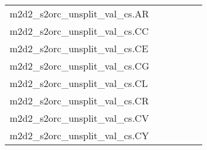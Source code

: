 {\begin{longtable}{m{6cm}m{1.7cm}m{1.7cm}m{1.7cm}m{1.7cm}m{1.7cm}}
	m2d2\_s2orc\_unsplit\_val\_cs.AR  & \colorbox[HTML]{a4d98a}{\makebox[\mywidth][c]{13.09}} & \colorbox[HTML]{e3f4aa}{\makebox[\mywidth][c]{13.36}} & \colorbox[HTML]{ffffe5}{\makebox[\mywidth][c]{15.30}} & \colorbox[HTML]{bfe596}{\makebox[\mywidth][c]{13.18}} & \colorbox[HTML]{77c578}{\makebox[\mywidth][c]{12.99}}\\
	m2d2\_s2orc\_unsplit\_val\_cs.CC  & \colorbox[HTML]{77c578}{\makebox[\mywidth][c]{8.45}} & \colorbox[HTML]{e8f6ae}{\makebox[\mywidth][c]{8.81}} & \colorbox[HTML]{ffffe5}{\makebox[\mywidth][c]{10.46}} & \colorbox[HTML]{d5eea1}{\makebox[\mywidth][c]{8.70}} & \colorbox[HTML]{a0d789}{\makebox[\mywidth][c]{8.54}}\\
	m2d2\_s2orc\_unsplit\_val\_cs.CE  & \colorbox[HTML]{c6e89a}{\makebox[\mywidth][c]{13.21}} & \colorbox[HTML]{def2a6}{\makebox[\mywidth][c]{13.31}} & \colorbox[HTML]{ffffe5}{\makebox[\mywidth][c]{15.01}} & \colorbox[HTML]{bee496}{\makebox[\mywidth][c]{13.18}} & \colorbox[HTML]{77c578}{\makebox[\mywidth][c]{13.02}}\\
	m2d2\_s2orc\_unsplit\_val\_cs.CG  & \colorbox[HTML]{77c578}{\makebox[\mywidth][c]{8.39}} & \colorbox[HTML]{e5f4ab}{\makebox[\mywidth][c]{8.68}} & \colorbox[HTML]{ffffe5}{\makebox[\mywidth][c]{10.12}} & \colorbox[HTML]{d3eda0}{\makebox[\mywidth][c]{8.59}} & \colorbox[HTML]{a9db8c}{\makebox[\mywidth][c]{8.47}}\\
	m2d2\_s2orc\_unsplit\_val\_cs.CL  & \colorbox[HTML]{bbe395}{\makebox[\mywidth][c]{14.66}} & \colorbox[HTML]{d0ec9e}{\makebox[\mywidth][c]{14.75}} & \colorbox[HTML]{ffffe5}{\makebox[\mywidth][c]{16.96}} & \colorbox[HTML]{c5e799}{\makebox[\mywidth][c]{14.70}} & \colorbox[HTML]{77c578}{\makebox[\mywidth][c]{14.47}}\\
	m2d2\_s2orc\_unsplit\_val\_cs.CR  & \colorbox[HTML]{9ad486}{\makebox[\mywidth][c]{14.63}} & \colorbox[HTML]{dcf1a5}{\makebox[\mywidth][c]{14.86}} & \colorbox[HTML]{ffffe5}{\makebox[\mywidth][c]{16.72}} & \colorbox[HTML]{bfe596}{\makebox[\mywidth][c]{14.74}} & \colorbox[HTML]{77c578}{\makebox[\mywidth][c]{14.56}}\\
	m2d2\_s2orc\_unsplit\_val\_cs.CV  & \colorbox[HTML]{c9e99b}{\makebox[\mywidth][c]{12.68}} & \colorbox[HTML]{e0f2a8}{\makebox[\mywidth][c]{12.78}} & \colorbox[HTML]{ffffe5}{\makebox[\mywidth][c]{14.38}} & \colorbox[HTML]{c1e597}{\makebox[\mywidth][c]{12.66}} & \colorbox[HTML]{77c578}{\makebox[\mywidth][c]{12.49}}\\
	m2d2\_s2orc\_unsplit\_val\_cs.CY  & \colorbox[HTML]{e9f6af}{\makebox[\mywidth][c]{16.01}} & \colorbox[HTML]{ddf1a6}{\makebox[\mywidth][c]{15.93}} & \colorbox[HTML]{ffffe5}{\makebox[\mywidth][c]{17.52}} & \colorbox[HTML]{c6e89a}{\makebox[\mywidth][c]{15.84}} & \colorbox[HTML]{77c578}{\makebox[\mywidth][c]{15.67}}\\

\end{longtable}}
